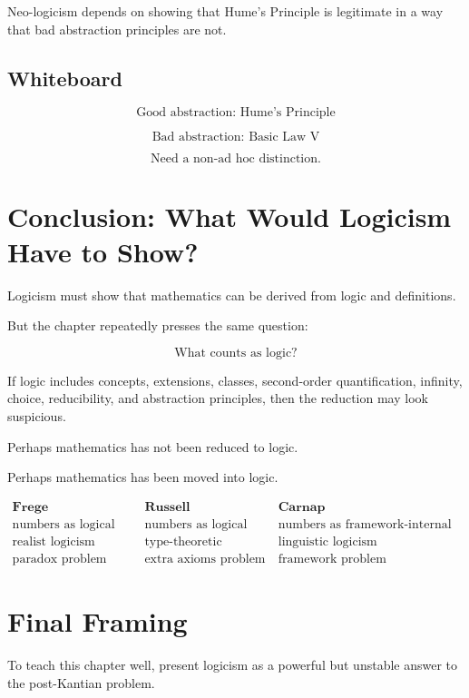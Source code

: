 \documentclass[11pt]{article}
\begin{document}
Neo-logicism depends on showing that Hume's Principle is legitimate in a way that bad
abstraction principles are not.

\subsection*{Whiteboard}

\[
\text{Good abstraction: Hume's Principle}
\]

\[
\text{Bad abstraction: Basic Law V}
\]

\[
\text{Need a non-ad hoc distinction.}
\]

\section*{Conclusion: What Would Logicism Have to Show?}

Logicism must show that mathematics can be derived from logic and definitions.

But the chapter repeatedly presses the same question:

\[
\boxed{
\text{What counts as logic?}
}
\]

If logic includes concepts, extensions, classes, second-order quantification, infinity,
choice, reducibility, and abstraction principles, then the reduction may look suspicious.

Perhaps mathematics has not been reduced to logic.

Perhaps mathematics has been moved into logic.

\[
\begin{array}{c|c|c}
\textbf{Frege} & \textbf{Russell} & \textbf{Carnap} \\
\hline
\text{numbers as logical objects} &
\text{numbers as logical fictions} &
\text{numbers as framework-internal entities} \\
\text{realist logicism} &
\text{type-theoretic logicism} &
\text{linguistic logicism} \\
\text{paradox problem} &
\text{extra axioms problem} &
\text{framework problem}
\end{array}
\]

\section*{Final Framing}

To teach this chapter well, present logicism as a powerful but unstable answer to the
post-Kantian problem.
\end{document}
